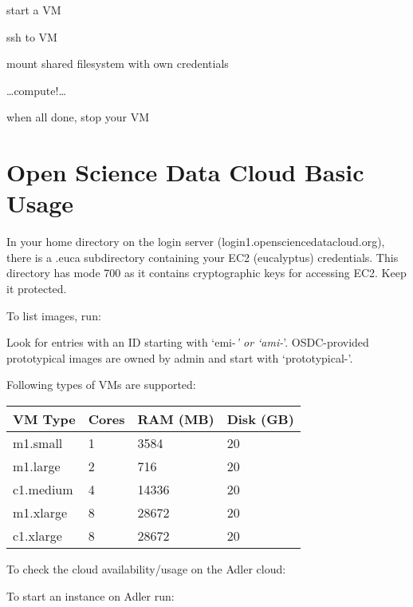 \documentclass[letterpaper,10pt,english]{sphinxmanual}
\begin{document}
start a VM

ssh to VM

mount shared filesystem with own credentials

…compute!…

when all done, stop your VM


\chapter{Open Science Data Cloud Basic Usage}
\label{basicusage:open-science-data-cloud-basic-usage}\label{basicusage::doc}
In your home directory on the login server (login1.opensciencedatacloud.org), there is a .euca subdirectory containing your EC2 (eucalyptus) credentials. This directory has mode 700 as it contains cryptographic keys for accessing EC2. Keep it protected.

To list images, run:
\begin{quote}

\end{quote}

Look for entries with an ID starting with ‘emi-\emph{’ or ‘ami-}’. OSDC-provided prototypical images are owned by admin and start with ‘prototypical-’.

Following types of VMs are supported:

\begin{tabulary}{\linewidth}{|L|L|L|L|}
\hline
\textbf{
VM Type
} & \textbf{
Cores
} & \textbf{
RAM (MB)
} & \textbf{
Disk (GB)
}\\\hline

m1.small
 & 
1
 & 
3584
 & 
20
\\\hline

m1.large
 & 
2
 & 
716
 & 
20
\\\hline

c1.medium
 & 
4
 & 
14336
 & 
20
\\\hline

m1.xlarge
 & 
8
 & 
28672
 & 
20
\\\hline

c1.xlarge
 & 
8
 & 
28672
 & 
20
\\\hline
\end{tabulary}


To check the cloud availability/usage on the Adler cloud:
\begin{quote}

\end{quote}

To start an instance on Adler run:
\begin{quote}

\end{quote}
\end{document}
